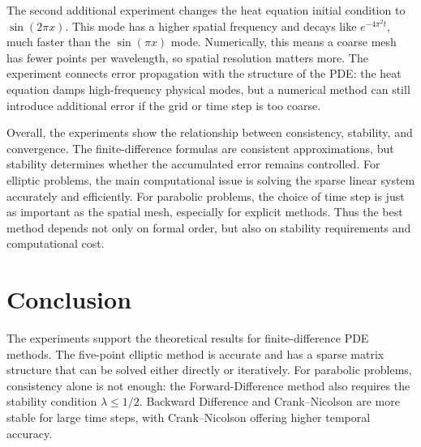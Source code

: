 \documentclass[11pt]{article}
\begin{document}
The second additional experiment changes the heat equation initial condition to
\(\sin(2\pi x)\). This mode has a higher spatial frequency and decays like
\(e^{-4\pi^2t}\), much faster than the \(\sin(\pi x)\) mode. Numerically, this
means a coarse mesh has fewer points per wavelength, so spatial resolution
matters more. The experiment connects error propagation with the structure of
the PDE: the heat equation damps high-frequency physical modes, but a numerical
method can still introduce additional error if the grid or time step is too
coarse.

Overall, the experiments show the relationship between consistency, stability,
and convergence. The finite-difference formulas are consistent approximations,
but stability determines whether the accumulated error remains controlled. For
elliptic problems, the main computational issue is solving the sparse linear
system accurately and efficiently. For parabolic problems, the choice of time
step is just as important as the spatial mesh, especially for explicit methods.
Thus the best method depends not only on formal order, but also on stability
requirements and computational cost.

\section{Conclusion}

The experiments support the theoretical results for finite-difference PDE
methods. The five-point elliptic method is accurate and has a sparse matrix
structure that can be solved either directly or iteratively. For parabolic
problems, consistency alone is not enough: the Forward-Difference method also
requires the stability condition \(\lambda\leq 1/2\). Backward Difference and
Crank--Nicolson are more stable for large time steps, with Crank--Nicolson
offering higher temporal accuracy.
\end{document}
